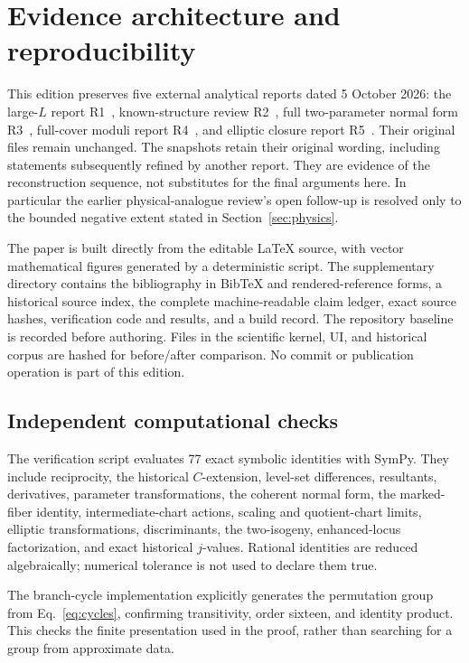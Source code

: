 \section{Evidence architecture and reproducibility}\label{app:evidence}

This edition preserves five external analytical reports dated 5 October 2026: the large-\(L\) report R1~\cite{R1}, known-structure review R2~\cite{R2}, full two-parameter normal form R3~\cite{R3}, full-cover moduli report R4~\cite{R4}, and elliptic closure report R5~\cite{R5}. Their original files remain unchanged. The snapshots retain their original wording, including statements subsequently refined by another report. They are evidence of the reconstruction sequence, not substitutes for the final arguments here. In particular the earlier physical-analogue review's open follow-up is resolved only to the bounded negative extent stated in Section~\ref{sec:physics}.

The paper is built directly from the editable LaTeX source, with vector mathematical figures generated by a deterministic script. The supplementary directory contains the bibliography in BibTeX and rendered-reference forms, a historical source index, the complete machine-readable claim ledger, exact source hashes, verification code and results, and a build record. The repository baseline is recorded before authoring. Files in the scientific kernel, UI, and historical corpus are hashed for before/after comparison. No commit or publication operation is part of this edition.

\subsection{Independent computational checks}
The verification script evaluates 77 exact symbolic identities with SymPy. They include reciprocity, the historical \(C\)-extension, level-set differences, resultants, derivatives, parameter transformations, the coherent normal form, the marked-fiber identity, intermediate-chart actions, scaling and quotient-chart limits, elliptic transformations, discriminants, the two-isogeny, enhanced-locus factorization, and exact historical \(j\)-values. Rational identities are reduced algebraically; numerical tolerance is not used to declare them true.

The branch-cycle implementation explicitly generates the permutation group from Eq.~\eqref{eq:cycles}, confirming transitivity, order sixteen, and identity product. This checks the finite presentation used in the proof, rather than searching for a group from approximate data.


